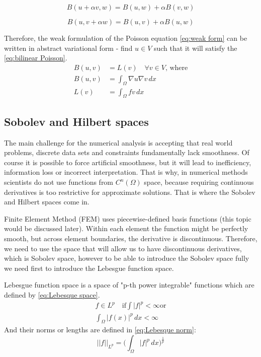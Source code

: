 \documentclass[conference]{IEEEtran}
\begin{document}
\begin{equation}
    B(u + \alpha v, w) = B(u, w) + \alpha B(v, w) 
    \label{eq:linearity first}
\end{equation}

\begin{equation}
    B(u, v + \alpha w) = B(u, v) + \alpha B(u, w)
    \label{eq:linearity second}
\end{equation}

Therefore, the weak formulation of the Poisson equation \ref{eq:weak form} can be written in abstract variational form - find $u \in V$ such that it will satisfy the \ref{eq:bilinear Poisson}.
\begin{equation}
\begin{aligned}
    B(u, v) &= L(v) \quad \forall v \in V \text{, where} \\
    B(u, v) &= \int_{\Omega}\nabla{u}\nabla{v} \, dx \\
    L(v) &= \int_{\Omega}fv \, dx
    \label{eq:bilinear Poisson}
\end{aligned}
\end{equation}


\subsection{Sobolev and Hilbert spaces}
The main challenge for the numerical analysis is accepting that real world problems, discrete data sets and constraints fundamentally lack smoothness. 
Of course it is possible to force artificial smoothness, but it will lead to inefficiency, information loss or incorrect interpretation. 
That is why, in numerical methods scientists do not use functions from $C^{n}(\Omega)$ space, because requiring continuous derivatives is too restrictive for approximate solutions. 
That is where the Sobolev and Hilbert spaces come in.

Finite Element Method (FEM) uses piecewise-defined basis functions (this topic would be discussed later). Within each element the function might be perfectly smooth, but across element boundaries, the derivative is discontinuous. 
Therefore, we need to use the space that will allow us to have discontinuous derivatives, which is Sobolev space, however to be able to introduce the Sobolev space fully we need first to introduce the Lebesgue function space. 

Lebesgue function space is a space of "p-th power integrable" functions which are defined by \ref{eq:Lebesque space}. 
\begin{equation}
\begin{aligned}
    f \in L^p \quad \text{if} \int |f|^p < \infty \text{or}\\
    \int_\Omega |f(x)|^p \, dx < \infty
    \label{eq:Lebesque space}
\end{aligned}
\end{equation}
And their norms or lengths are defined in \ref{eq:Lebesque norm}:
\begin{equation}
    ||f||_{L^p} = \Bigg(\int_{\Omega} |f|^p \, dx \Bigg)^{\frac{1}{p}}
    \label{eq:Lebesque norm}
\end{equation}
\end{document}
